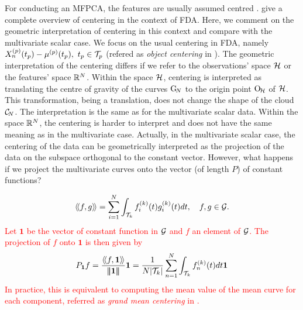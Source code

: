 For conducting an MFPCA, the features are usually assumed centred \citep{happMultivariateFunctionalPrincipal2018a}. \cite{protheroNewPerspectivesCentering2021} give a complete overview of centering in the context of FDA. Here, we comment on the geometric interpretation of centering in this context and compare with the multivariate scalar case. We focus on the usual centering in FDA, namely $X_n^{(p)}(t_p) - \mu^{(p)}(t_p),~t_p \in \mathcal{T}_{p}$ (refered as \emph{object centering} in \cite{protheroNewPerspectivesCentering2021}).
The geometric interpretation of the centering differs if we refer to the observations' space $\mathcal{H}$ or the features' space $\mathbb{R}^N$. Within the space $\mathcal{H}$, centering is interpreted as translating the centre of gravity of the curves $\mathrm{G}_{\!N}$ to the origin point $\mathrm{O}_{\!\mathcal{H}}$ of $\mathcal{H}$. This transformation, being a translation, does not change the shape of the cloud $\mathcal{C}_{\!N}$. The interpretation is the same as for the multivariate scalar data. Within the space $\mathbb{R}^N$, the centering is harder to interpret and does not have the same meaning as in the multivariate case. Actually, in the multivariate scalar case, the centering of the data can be geometrically interpreted as the projection of the data on the subspace orthogonal to the constant vector. However, what happens if we project the multivariate curves onto the vector (of length $P$) of constant functions?

\textcolor{red}{
\begin{equation}
\langle\!\langle f, g\rangle\!\rangle = \sum_{i = 1}^N \int_{\mathcal{T}_{k}} f^{(k)}_i(t)g^{(k)}_i(t)dt, \quad f, g \in \mathcal{G}.
\end{equation}
Let $\mathbf{1}$ be the vector of constant function in $\mathcal{G}$ and $f$ an element of $\mathcal{G}$. The projection of $f$ onto $\mathbf{1}$ is then given by
\begin{equation}
P_{\mathbf{1}}f = \frac{\langle\!\langle f, \mathbf{1}\rangle\!\rangle}{\left|\!\left|\!\left|\mathbf{1}\right|\!\right|\!\right|}\mathbf{1} = \frac{1}{N\lvert \mathcal{T}_{k} \rvert}\sum_{n = 1}^N \int_{\mathcal{T}_{k}} f^{(k)}_n(t)dt\mathbf{1}
\end{equation}
In practice, this is equivalent to computing the mean value of the mean curve for each component, referred as \emph{grand mean centering} in \cite{protheroNewPerspectivesCentering2021}.}

